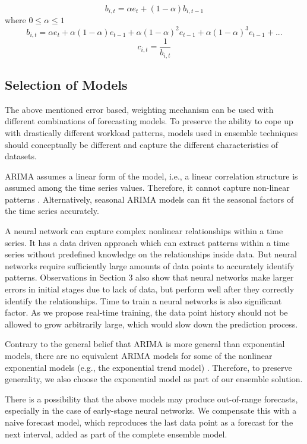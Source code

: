 $$b_{i,t}= \alpha e_t + (1-\alpha)b_{i,t-1}$$
where $0\leq \alpha \leq 1$
$$b_{i,t}=\alpha e_t + \alpha(1-\alpha)e_{t-1}+\alpha(1-\alpha)^2e_{t-1}+\alpha(1-\alpha)^3e_{t-1}+ . .. $$
$$c_{i,t}=\frac{1}{b_{i,t}}$$

\subsection{Selection of Models}
The above mentioned error based, weighting mechanism can be used with different combinations of forecasting models. To preserve the ability to cope up with drastically different workload patterns, models used in ensemble techniques should conceptually be different and capture the different characteristics of datasets.

ARIMA assumes a linear form of the model, i.e., a linear correlation structure is assumed among the time series values. Therefore, it cannot capture non-linear patterns \cite{Zhang_2003}. Alternatively, seasonal ARIMA models can fit the seasonal factors of the time series accurately.

A neural network can capture complex nonlinear relationships within a time series. It has a data driven approach which can extract patterns within a time series without predefined knowledge on the relationships inside data. But neural networks require sufficiently large amounts of data points to accurately identify patterns. Observations in Section 3 also show that neural networks make larger errors in initial stages due to lack of data, but perform well after they correctly identify the relationships. Time to train a neural networks is also significant factor. As we propose real-time training, the data point history should not be allowed to grow arbitrarily large, which would slow down the prediction process.

Contrary to the general belief that ARIMA is more general than exponential models, there are no equivalent ARIMA models for some of the nonlinear exponential models (e.g., the exponential trend model) \cite{AHyndman 2013}. Therefore, to preserve generality, we also choose the exponential model as part of our ensemble solution.

There is a possibility that the above models may produce out-of-range forecasts, especially in the case of early-stage neural networks. We compensate this with a naive forecast model, which reproduces the last data point as a forecast for the next interval, added as part of the complete ensemble model.


